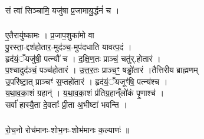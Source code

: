 \subsubsection{}
सं त्वा॑ सिञ्चामि॒ यजु॑षा प्र॒जामायु॒र्द्धनं॑ च ।\\
\subsubsection{}
ए॒तैरायु॑ष्कामः । प्र॒जाप॒शुका॑मो वा\\
पु॒रस्ता॒-द्दश॑होतार॒-मुद॑ञ्च॒-मुप॑दधाति यावत्प॒दं ।\\
हृद॑यं॒ँयजु॑षी॒ पत्न्यौ॑ च । द॒क्षि॒ण॒तः प्राञ्चं॒ चतु॑र्.होतारं ।\\
प॒श्चादुद॑ञ्चं॒ पञ्च॑होतारं । उ॒त्त॒र॒तः प्राञ्च॒ꣳ॒ षड्ढो॑तारं ।तैत्तिरीय ब्राह्मणम्\\
उ॒परि॑ष्टा॒त् प्राञ्चꣳ॑ स॒प्तहो॑तारं । हृद॑यं॒ँयजूꣳ॑षि॒ पत्न्य॑श्च ।\\
य॒था॒व॒का॒शं ग्रहान्॑ । य॒था॒व॒का॒शं प्र॑तिग्र॒हान्ँलो॑कं पृ॒णाश्च॑ ।\\
सर्वा॑ हास्यै॒ता दे॒वताः᳚ प्री॒ता अ॒भीष्टा॑ भवन्ति । \\
\subsubsection{}
रो॒च॒नो रोच॑मानः-शोभ॒नः-शोभ॑मानः क॒ल्याणः॑ ॥\\




